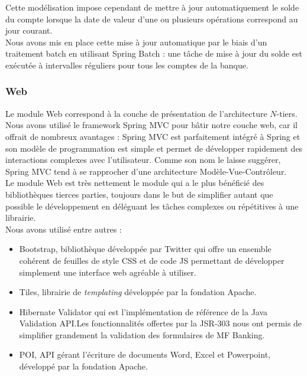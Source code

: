Cette modélisation impose cependant de mettre à jour automatiquement le solde du compte lorsque la date de valeur d'une ou plusieurs opérations correspond au jour courant.\\
Nous avons mis en place cette mise à jour automatique par le biais d'un traitement batch en utilisant Spring Batch : une tâche de mise à jour du solde est exécutée à intervalles réguliers pour tous les comptes de la banque.\\

\subsubsection*{Web}

Le module Web correspond à la couche de présentation de l'architecture $N$-tiers.\\
Nous avons utilisé le framework Spring MVC pour bâtir notre couche web, car il offrait de nombreux avantages : Spring MVC est parfaitement intégré à Spring et son modèle de programmation est simple et permet de développer rapidement des interactions complexes avec l'utilisateur. Comme son nom le laisse suggérer, Spring MVC tend à se rapprocher d'une architecture Modèle-Vue-Contrôleur.\\

Le module Web est très nettement le module qui a le plus bénéficié des bibliothèques tierces parties, toujours dans le but de simplifier autant que possible le développement en déléguant les tâches complexes ou répétitives à une librairie.\\
Nous avons utilisé entre autres : 
\begin{itemize}
	\item Bootstrap, bibliothèque développée par Twitter qui offre un ensemble cohérent de feuilles de style CSS et de code JS permettant de développer simplement une interface web agréable à utiliser.
	\item Tiles, librairie de \textit{templating} développée par la fondation Apache.
	\item Hibernate Validator qui est l'implémentation de référence de la Java Validation API.Les fonctionnalités offertes par la JSR-303 nous ont permis de simplifier grandement la validation des formulaires de MF Banking.
	\item POI, API gérant l'écriture de documents Word, Excel et Powerpoint, développé par la fondation Apache.\\
\end{itemize}

